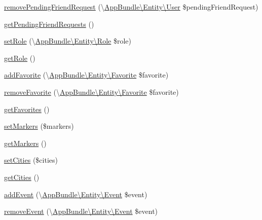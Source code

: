 \begin{DoxyCompactItemize}
\item 
\hyperlink{classAppBundle_1_1Entity_1_1User_a551c41da5b479d91f9dadb9ae6de1ea7}{remove\+Pending\+Friend\+Request} (\textbackslash{}\hyperlink{classAppBundle_1_1Entity_1_1User}{App\+Bundle\textbackslash{}\+Entity\textbackslash{}\+User} \$pending\+Friend\+Request)
\item 
\hyperlink{classAppBundle_1_1Entity_1_1User_a8adb6142b8443d5cb2b63c55327f067b}{get\+Pending\+Friend\+Requests} ()
\item 
\hyperlink{classAppBundle_1_1Entity_1_1User_ab1eb464976d6d6b645100348a7eb59fd}{set\+Role} (\textbackslash{}\hyperlink{classAppBundle_1_1Entity_1_1Role}{App\+Bundle\textbackslash{}\+Entity\textbackslash{}\+Role} \$role)
\item 
\hyperlink{classAppBundle_1_1Entity_1_1User_a6481a9707a292bce8e9aebcf97f57721}{get\+Role} ()
\item 
\hyperlink{classAppBundle_1_1Entity_1_1User_a80ba0ef78ad298274abe11cbc6b7e5dc}{add\+Favorite} (\textbackslash{}\hyperlink{classAppBundle_1_1Entity_1_1Favorite}{App\+Bundle\textbackslash{}\+Entity\textbackslash{}\+Favorite} \$favorite)
\item 
\hyperlink{classAppBundle_1_1Entity_1_1User_af7cb4c6bea6a124059f98953dd77d21b}{remove\+Favorite} (\textbackslash{}\hyperlink{classAppBundle_1_1Entity_1_1Favorite}{App\+Bundle\textbackslash{}\+Entity\textbackslash{}\+Favorite} \$favorite)
\item 
\hyperlink{classAppBundle_1_1Entity_1_1User_aa3edb74a8f3d7af87a13530706583967}{get\+Favorites} ()
\item 
\hyperlink{classAppBundle_1_1Entity_1_1User_a3eb7c1f0d489635d719d2b31ffa13fb2}{set\+Markers} (\$markers)
\item 
\hyperlink{classAppBundle_1_1Entity_1_1User_acc8771e3c9635a1b8839f32a51c4fb34}{get\+Markers} ()
\item 
\hyperlink{classAppBundle_1_1Entity_1_1User_af69ae82da33c9232d1eca16653076ac3}{set\+Cities} (\$cities)
\item 
\hyperlink{classAppBundle_1_1Entity_1_1User_a81b6376d8ea4d57d8e60252f63582ea7}{get\+Cities} ()
\item 
\hyperlink{classAppBundle_1_1Entity_1_1User_ad59ebbe8eb918cc31422beeebbaa9b6c}{add\+Event} (\textbackslash{}\hyperlink{classAppBundle_1_1Entity_1_1Event}{App\+Bundle\textbackslash{}\+Entity\textbackslash{}\+Event} \$event)
\item 
\hyperlink{classAppBundle_1_1Entity_1_1User_a489a840a6fda94d0d811cd4c6294357f}{remove\+Event} (\textbackslash{}\hyperlink{classAppBundle_1_1Entity_1_1Event}{App\+Bundle\textbackslash{}\+Entity\textbackslash{}\+Event} \$event)

\end{DoxyCompactItemize}
